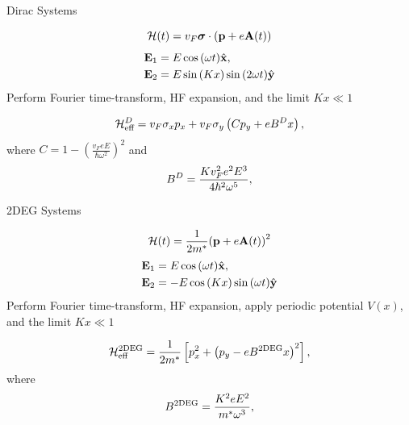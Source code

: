\documentclass[xcolor=dvipsnames,10pt,aspectratio=169]{beamer}
\let\oldhat\hat
\renewcommand{\hat}[1]{\oldhat{\mathbf{#1}}}
\renewcommand{\vec}[1]{\mathbf{#1}}
\newcommand{\ham}{\mathcal{H}}
\begin{document}
  \begin{frame}{Dirac Systems}

    \begin{equation}
      \small
      \ham (t) = v_F \bm{\sigma} \cdot \left(\vec{p} + e \vec{A}(t)\right)
    \end{equation}
    \begin{align}
      \small
      \vec{E}_1 &= E\cos{(\omega t)} \hat{x}, \nonumber \\
      \vec{E}_2 &= E\sin{(Kx)}\sin{(2\omega t)} \hat{y}
    \end{align}
    Perform Fourier time-transform, HF expansion, and the limit $Kx\ll1$

    \begin{equation}
      \small
      \ham_{\text{eff}}^{D} = v_F \sigma_x p_x + v_F \sigma_y \left( C p_y + eB^Dx \right),
    \end{equation}
    where $C = 1 - {\left(\tfrac{v_F eE}{\hbar \omega^2}\right)}^2$ and
    \begin{align}
      \small
      B^{D} &= \frac{K v_F^2 e^2 E^3}{4\hbar^2 \omega^5}, \\
    \end{align}


  \end{frame}

  \begin{frame}{2DEG Systems}

    \begin{equation}
      \small
      \ham (t) = \dfrac{1}{2m^*} {\left( \vec{p} +e \vec{A}(t)\right)}^2
    \end{equation}
    \begin{align}
      \small
      \vec{E}_1 &= E\cos{(\omega t)} \hat{x},\nonumber \\
      \vec{E}_2 &= -E\cos{(Kx)}\sin{(\omega t)} \hat{y}
    \end{align}
    Perform Fourier time-transform, HF expansion, apply periodic potential $V(x)$, and the limit $Kx\ll1$

    \begin{equation}
      \small
      \ham_{\text{eff}}^{\text{2DEG}} = \frac{1}{2m^*} \left[ p_x^2 + {\left(p_y - eB^{\text{2DEG}}x \right)}^2\right],
    \end{equation}
    where
    \begin{align}
      \small
      B^{\text{2DEG}} &= \frac{K^2 e E^2}{m^* \omega^3}, \\
    \end{align}

  \end{frame}
\end{document}
